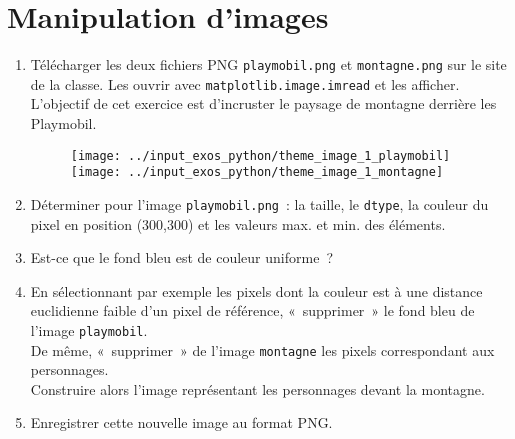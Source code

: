 \section{Manipulation d'images}

\begin{enumerate}
\item 
  Télécharger les deux fichiers PNG \texttt{playmobil.png} et
  \texttt{montagne.png} sur le site de la classe. Les
  ouvrir avec \texttt{matplotlib.image.imread} et les afficher.\\
  L'objectif de cet exercice est d'incruster le paysage de montagne
  derrière les Playmobil\textsuperscript{\textregistered}.

\begin{figure}[h]
  \centering
  \texttt{[image: ../input\_exos\_python/theme\_image\_1\_playmobil]}
  \texttt{[image: ../input\_exos\_python/theme\_image\_1\_montagne]}
\end{figure}

\item 
  Déterminer pour l'image \texttt{playmobil.png}~: la taille, le
  \texttt{dtype}, la couleur du  pixel en position (300,300) et les
  valeurs max. et min. des éléments. 

\item 
  Est-ce que le fond bleu est de couleur uniforme~?


\item
  En sélectionnant par exemple les pixels dont la couleur est à une
  distance euclidienne faible d'un pixel de référence, «~supprimer~»
  le fond bleu de l'image \texttt{playmobil}. \\
  De même, «~supprimer~» de
  l'image \texttt{montagne} les pixels correspondant aux personnages.\\
  Construire alors l'image représentant les personnages devant la
  montagne. 

\item
  Enregistrer cette nouvelle image au format PNG. 

\end{enumerate}

